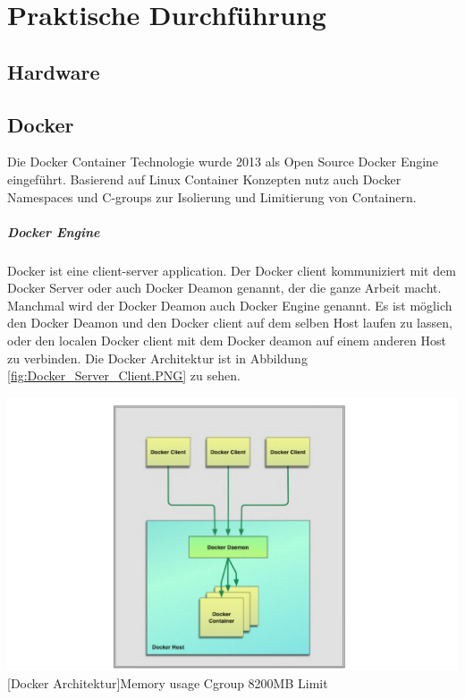 \thispagestyle{empty}
\section{Praktische Durchführung}
\subsection{Hardware}


\pagebreak
\subsection{Docker}
Die Docker Container Technologie wurde 2013 als Open Source Docker Engine eingeführt. Basierend auf Linux Container Konzepten nutz auch Docker Namespaces und C-groups zur Isolierung und Limitierung von Containern.  

\subparagraph{Docker Engine}
Docker ist eine client-server application. Der Docker client kommuniziert mit dem Docker Server oder auch Docker Deamon genannt, der die ganze Arbeit macht. Manchmal wird der Docker Deamon auch Docker Engine genannt. Es ist möglich den Docker Deamon und den Docker client auf dem selben Host laufen zu lassen, oder den localen Docker client mit dem Docker deamon auf einem anderen Host zu verbinden. Die Docker Architektur ist in Abbildung \ref{fig:Docker_Server_Client.PNG} zu sehen\cite{Turnbull2015TheBook}.

\vspace{1em}
\begin{minipage}{\linewidth}
	\centering
	\includegraphics[width=1\linewidth]{pics/Docker_Server_Client.PNG}
	[Docker Architektur\cite{Turnbull2015TheBook}]{Memory usage Cgroup 8200MB Limit}
	\label{fig:Docker_Server_Client.PNG}
\end{minipage}

